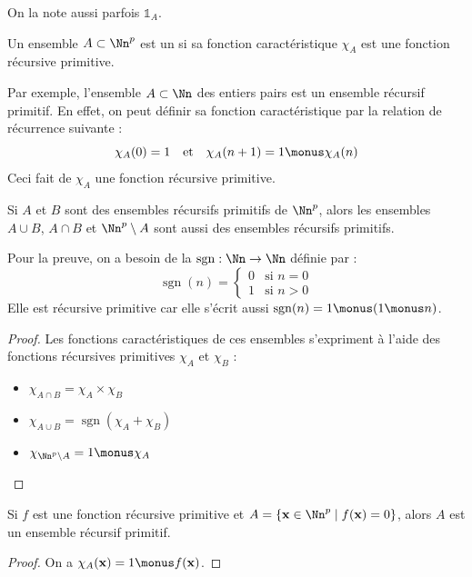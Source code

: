 \documentclass[11pt,class=report,crop=false]{standalone}
\begin{document}
On la note aussi parfois $\mathbb{1}_A$.

\begin{definition}
Un ensemble $A \subset \Nn^p$ est un  si sa fonction caractéristique $\chi_A$ est une fonction récursive primitive.
\end{definition}

Par exemple, l'ensemble $A \subset \Nn$ des entiers pairs est un ensemble récursif primitif. 
En effet, on peut définir sa fonction caractéristique par la relation de récurrence suivante :
\[ \chi_A(0) = 1 \quad \text{et} \quad \chi_A(n+1) = 1 \monus \chi_A(n) \]
Ceci fait de $\chi_A$ une fonction récursive primitive.

\begin{proposition}
Si $A$ et $B$ sont des ensembles récursifs primitifs de $\Nn^p$, alors les ensembles $A \cup B$, $A \cap B$ et $\Nn^p \setminus A$ sont aussi des ensembles récursifs primitifs.
\end{proposition}


Pour la preuve, on a besoin de la  $\operatorname{sgn} : \Nn \to \Nn$ définie par :
\[ \operatorname{sgn}(n) = \begin{cases} 0 & \text{si } n = 0 \\ 1 & \text{si } n > 0 \end{cases} \]
Elle est récursive primitive car elle s'écrit aussi $\operatorname{sgn}(n) = 1 \monus (1 \monus n)$.

\begin{proof}
Les fonctions caractéristiques de ces ensembles s'expriment à l'aide des fonctions récursives primitives $\chi_A$ et $\chi_B$ :
\begin{itemize}
    \item $\chi_{A \cap B} = \chi_A \times \chi_B$
    \item $\chi_{A \cup B} = \operatorname{sgn}(\chi_A + \chi_B)$
    \item $\chi_{\Nn^p \setminus A} = 1 \monus \chi_A$
\end{itemize}
\end{proof}

\begin{proposition}
Si $f$ est une fonction récursive primitive et $A = \{ \mathbf{x} \in \Nn^p \mid f(\mathbf{x}) = 0 \}$, alors $A$ est un ensemble récursif primitif.
\end{proposition}

\begin{proof}
On a $\chi_A(\mathbf{x}) = 1 \monus f(\mathbf{x})$.
\end{proof}
\end{document}
